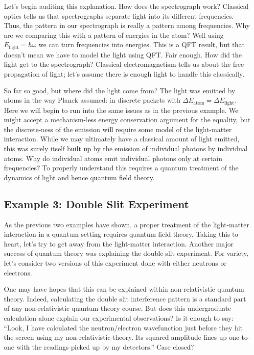 \documentclass[prd,twocolumn,superscriptaddress,floatfix,amsmath,amssymb,amsfonts,nofootinbib]{revtex4-2}
\begin{document}
Let's begin auditing this explanation. How does the spectrograph work? Classical optics tells us that spectrographs separate light into its different frequencies. Thus, the pattern in our spectrograph is really a pattern among frequencies. Why are we comparing this with a pattern of energies in the atom? Well using $E_\text{light}=\hbar\omega$ we can turn frequencies into energies. This is a QFT result, but that doesn't mean we have to model the light using QFT. Fair enough. How did the light get to the spectrograph? Classical electromagnetism tells us about the free propagation of light; let's assume there is enough light to handle this classically.

So far so good, but where did the light come from? The light was emitted by atoms in the way Planck assumed: in discrete packets with \mbox{$\Delta E_\text{atom}=\Delta E_\text{light}$}. Here we will begin to run into the same issues as in the previous example. We might accept a mechanism-less energy conservation argument for the equality, but the discrete-ness of the emission will require some model of the light-matter interaction. While we may ultimately have a classical amount of light emitted, this was surely itself built up by the emission of individual photons by individual atoms. Why do individual atoms emit individual photons only at certain frequencies? To properly understand this requires a quantum treatment of the dynamics of light and hence quantum field theory.

\subsection{Example 3: Double Slit Experiment}\label{SecDoubleSlit}
As the previous two examples have shown, a proper treatment of the light-matter interaction in a quantum setting requires quantum field theory. Taking this to heart, let's try to get away from the light-matter interaction. Another major success of quantum theory was explaining the double slit experiment. For variety, let's consider two versions of this experiment done with either neutrons or electrons.

One may have hopes that this can be explained within non-relativistic quantum theory. Indeed, calculating the double slit interference pattern is a standard part of any non-relativistic quantum theory course. But does this undergraduate calculation alone explain our experimental observations? Is it enough to say: ``Look, I have calculated the neutron/electron wavefunction just before they hit the screen using my non-relativistic theory. Its squared amplitude lines up one-to-one with the readings picked up by my detectors.'' Case closed? 
\end{document}
